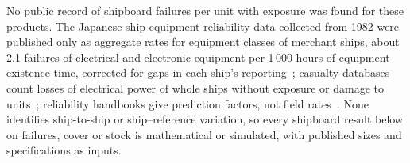 No public record of shipboard failures per unit with exposure was found for
these products. The Japanese ship-equipment reliability data collected from
1982 were published only as aggregate rates for equipment classes of merchant
ships, about 2.1 failures of electrical and electronic equipment per 1\,000
hours of equipment existence time, corrected for gaps in each ship's
reporting~\cite{kiriya2001}; casualty
databases count losses of electrical power of whole ships without exposure or
damage to units~\cite{emsa2025,maib_portal}; reliability handbooks give
prediction factors, not field rates~\cite{milhdbk217f}. None identifies
ship-to-ship or ship--reference variation, so every shipboard result below on
failures, cover or stock is mathematical or simulated, with published sizes
and specifications as inputs.
